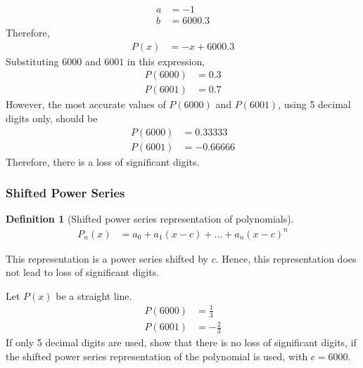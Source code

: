 \documentclass[fleqn, a4paper, 12pt, twoside]{article}
\theoremstyle{definition}
\newtheorem{definition}{Definition}
\theoremstyle{theorem}
\begin{document}
\begin{solution}
\begin{align*}
		a &= -1\\
		b &= 6000.3
	\end{align*}
	Therefore,
	\begin{align*}
		P(x) &= -x + 6000.3
	\end{align*}
	Substituting $6000$ and $6001$ in this expression,
	\begin{align*}
		P(6000) &= 0.3\\
		P(6001) &= 0.7
	\end{align*}
	However, the most accurate values of $P(6000)$ and $P(6001)$, using 5 decimal digits only, should be
	\begin{align*}
		P(6000) &= 0.33333\\
		P(6001) &= -0.66666
	\end{align*}
	Therefore, there is a loss of significant digits.
\end{solution}

\subsubsection{Shifted Power Series}

\begin{definition}[Shifted power series representation of polynomials]
	\begin{align*}
		P_n(x) &= a_0 + a_1 (x - c) + \dots + a_n (x - c)^n
	\end{align*}
\end{definition}

This representation is a power series shifted by $c$.
Hence, this representation does not lead to loss of significant digits.

\begin{question}
	Let $P(x)$ be a straight line.
	\begin{align*}
		P(6000) &= \frac{1}{3}\\
		P(6001) &= -\frac{2}{3}
	\end{align*}
	If only 5 decimal digits are used, show that there is no loss of significant digits, if the shifted power series representation of the polynomial is used, with $c = 6000$.
\end{question}
\end{document}
